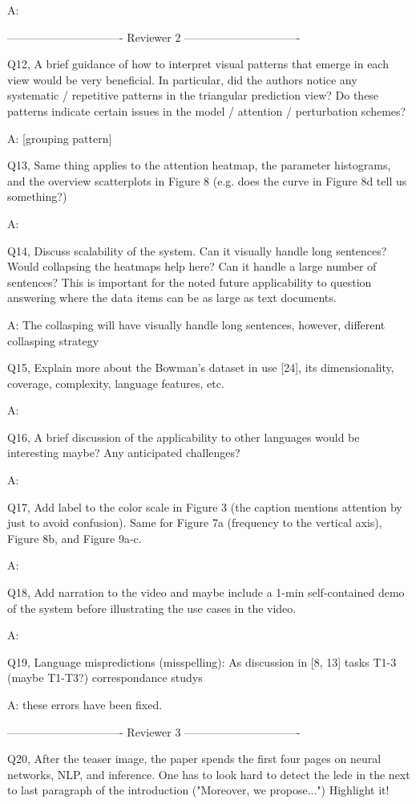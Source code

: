 A:

------------------------------- Reviewer 2 -------------------------------

Q12, A brief guidance of how to interpret visual patterns that emerge in each view would be very beneficial. In particular, did the authors notice any systematic / repetitive patterns in the triangular prediction view? Do these patterns indicate certain issues in the model / attention / perturbation schemes?

A: [grouping pattern]

Q13, Same thing applies to the attention heatmap, the parameter histograms, and the overview scatterplots in Figure 8 (e.g. does the curve in Figure 8d tell us something?)

A:

Q14, Discuss scalability of the system. Can it visually handle long sentences? Would collapsing the heatmaps help here? Can it handle a large number of sentences? This is important for the noted future applicability to question answering where the data items can be as large as text documents.

A: The collasping will have visually handle long sentences, however, different collasping strategy

Q15, Explain more about the Bowman's dataset in use [24], its dimensionality, coverage, complexity, language features, etc.

A:

Q16, A brief discussion of the applicability to other languages would be interesting maybe? Any anticipated challenges?

A:

Q17, Add label to the color scale in Figure 3 (the caption mentions attention by just to avoid confusion). Same for Figure 7a (frequency to the vertical axis), Figure 8b, and Figure 9a-c.

A:

Q18, Add narration to the video and maybe include a 1-min self-contained demo of the system before illustrating the use cases in the video.

A:

Q19, Language mispredictions (misspelling):
As discussion in [8, 13]
tasks T1-3 (maybe T1-T3?)
correspondance
studys

A: these errors have been fixed.

------------------------------- Reviewer 3 -------------------------------

Q20, After the teaser image, the paper spends the first four pages on neural networks, NLP, and inference. One has to look hard to detect the lede in the next to last paragraph of the introduction ("Moreover, we propose...") Highlight it!

